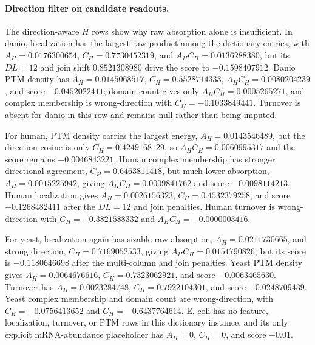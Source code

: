 \paragraph{Direction filter on candidate readouts.}
The direction-aware $H$ rows show why raw absorption alone is insufficient.  In danio, localization has the largest raw product among the dictionary entries, with $A_H=0.0176300654$, $C_H=0.7730452319$, and $A_HC_H=0.0136288380$, but its $DL=12$ and join shift $0.8521308980$ drive the score to $-0.1598407912$.  Danio PTM density has $A_H=0.0145068517$, $C_H=0.5528714333$, $A_HC_H=0.0080204239$, and score $-0.0452022411$; domain count gives only $A_HC_H=0.0005265271$, and complex membership is wrong-direction with $C_H=-0.1033849441$.  Turnover is absent for danio in this row and remains null rather than being imputed.

For human, PTM density carries the largest energy, $A_H=0.0143546489$, but the direction cosine is only $C_H=0.4249168129$, so $A_HC_H=0.0060995317$ and the score remains $-0.0046843221$.  Human complex membership has stronger directional agreement, $C_H=0.6463811418$, but much lower absorption, $A_H=0.0015225942$, giving $A_HC_H=0.0009841762$ and score $-0.0098114213$.  Human localization gives $A_H=0.0026156323$, $C_H=0.4532379258$, and score $-0.1268482411$ after the $DL=12$ and join penalties.  Human turnover is wrong-direction with $C_H=-0.3821588332$ and $A_HC_H=-0.0000003416$.

For yeast, localization again has sizable raw absorption, $A_H=0.0211730665$, and strong direction, $C_H=0.7169052533$, giving $A_HC_H=0.0151790826$, but its score is $-0.1180646698$ after the multi-column and join penalties.  Yeast PTM density gives $A_H=0.0064676616$, $C_H=0.7323062921$, and score $-0.0063465630$.  Turnover has $A_H=0.0023284748$, $C_H=0.7922104301$, and score $-0.0248709439$.  Yeast complex membership and domain count are wrong-direction, with $C_H=-0.0756413652$ and $C_H=-0.6437764614$.  E. coli has no feature, localization, turnover, or PTM rows in this dictionary instance, and its only explicit mRNA-abundance placeholder has $A_H=0$, $C_H=0$, and score $-0.01$.

